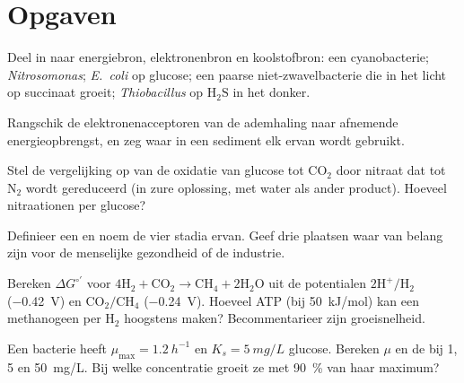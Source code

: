 \section{Opgaven}

\begin{exercise}[$\star$]\label{exo:b2:microbial-metabolism:1}
Deel in naar energiebron, elektronenbron en koolstofbron: een
cyanobacterie; \emph{Nitrosomonas}; \emph{E.~coli} op glucose; een
paarse niet-zwavelbacterie die in het licht op succinaat groeit;
\emph{Thiobacillus} op $\mathrm{H_2S}$ in het donker.
\end{exercise}

\begin{exercise}[$\star$]\label{exo:b2:microbial-metabolism:2}
Rangschik de elektronenacceptoren van de ademhaling naar afnemende
energieopbrengst, en zeg waar in een sediment elk ervan wordt gebruikt.
\end{exercise}

\begin{exercise}[$\star$]\label{exo:b2:microbial-metabolism:3}
Stel de vergelijking op van de oxidatie van glucose tot $\mathrm{CO_2}$
door nitraat dat tot $\mathrm{N_2}$ wordt gereduceerd (in zure oplossing,
met water als ander product). Hoeveel nitraationen per glucose?
\end{exercise}

\begin{exercise}[$\star$]\label{exo:b2:microbial-metabolism:4}
Definieer een  en noem de vier stadia ervan. Geef drie plaatsen
waar  van belang zijn voor de menselijke gezondheid of de industrie.
\end{exercise}

\begin{exercise}[$\star\star$]\label{exo:b2:microbial-metabolism:5}
Bereken $\Delta G^{\circ\prime}$ voor $4\mathrm{H_2} + \mathrm{CO_2}
\to \mathrm{CH_4} + 2\mathrm{H_2O}$ uit de potentialen
$\mathrm{2H^+/H_2}$ (\qty{-0.42}{V}) en $\mathrm{CO_2/CH_4}$
(\qty{-0.24}{V}). Hoeveel ATP (bij \qty{50}{kJ/mol}) kan een methanogeen
per $\mathrm{H_2}$ hoogstens maken? Becommentarieer zijn groeisnelheid.
\end{exercise}

\begin{exercise}[$\star\star$]\label{exo:b2:microbial-metabolism:6}
Een bacterie heeft $\mu_{\max} = \qty{1.2}{h^{-1}}$ en $K_s =
\qty{5}{mg/L}$ glucose. Bereken $\mu$ en de  bij
1, 5 en \qty{50}{mg/L}. Bij welke concentratie groeit ze met
\qty{90}{\%} van haar maximum?
\end{exercise}

